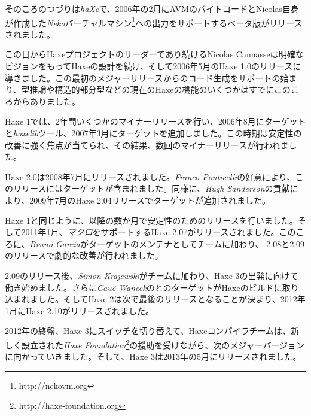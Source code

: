 そのころのつづりは\emph{haXe}で、2006年の2月にAVMのバイトコードとNicolas自身が作成した\emph{Neko}バーチャルマシン\footnote{http://nekovm.org}への出力をサポートするベータ版がリリースされました。

この日からHaxeプロジェクトのリーダーであり続けるNicolas Cannasseは明確なビジョンをもってHaxeの設計を続け、そして2006年5月のHaxe 1.0のリリースに導きました。この最初のメジャーリリースからのコード生成をサポートの始まり、型推論や構造的部分型などの現在のHaxeの機能のいくつかはすでにこのころからありました。

Haxe 1では、2年間いくつかのマイナーリリースを行い、2006年8月にターゲットと\emph{haxelib}ツール、2007年3月にターゲットを追加しました。この時期は安定性の改善に強く焦点が当てられ、その結果、数回のマイナーリリースが行われました。

Haxe 2.0は2008年7月にリリースされました。\emph{Franco Ponticelli}の好意により、このリリースにはターゲットが含まれました。同様に、\emph{Hugh Sanderson}の貢献により、2009年7月のHaxe 2.04リリースでターゲットが追加されました。

Haxe 1と同じように、以降の数か月で安定性のためのリリースを行いました。そして2011年1月、\emph{マクロ}をサポートするHaxe 2.07がリリースされました。このころに、\emph{Bruno Garcia}がターゲットのメンテナとしてチームに加わり、 2.08と2.09のリリースで劇的な改善が行われました。

2.09のリリース後、\emph{Simon Krajewski}がチームに加わり、Haxe 3の出発に向けて働き始めました。さらに\emph{Cau\^{e} Waneck}のとのターゲットがHaxeのビルドに取り込まれました。そしてHaxe 2は次で最後のリリースとなることが決まり、2012年1月にHaxe 2.10がリリースされました。

2012年の終盤、Haxe 3にスイッチを切り替えて、Haxeコンパイラチームは、新しく設立された\emph{Haxe Foundation}\footnote{http://haxe-foundation.org}の援助を受けながら、次のメジャーバージョンに向かっていきました。そして、Haxe 3は2013年の5月にリリースされました。
